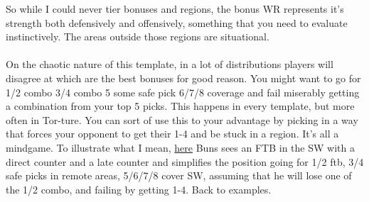 So while I could never tier bonuses and regions, the bonus WR represents it's strength both defensively and offensively, something that you need to evaluate instinctively. The areas outside those regions are situational. 
\\
\\
On the chaotic nature of this template, in a lot of distributions players will disagree at which are the best bonuses for good reason. You might want to go for 1/2 combo 3/4 combo 5 some safe pick 6/7/8 coverage and fail miserably getting a combination from your top 5 picks. This happens in every template, but more often in Tor-ture. You can sort of use this to your advantage by picking in a way that forces your opponent to get their 1-4 and be stuck in a region. It's all a mindgame. To illustrate what I mean, \href{https://www.warzone.com/MultiPlayer?GameID=23184731}{here} Buns sees an FTB in the SW with a direct counter and a late counter and simplifies the position going for 1/2 ftb, 3/4 safe picks in remote areas, 5/6/7/8 cover SW, assuming that he will lose one of the 1/2 combo, and failing by getting 1-4. Back to examples.

